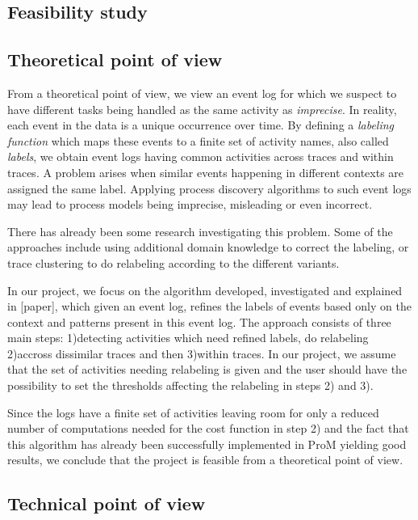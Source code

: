 \documentclass[notitlepage]{article}
\begin{document}
\begin{flushleft}
\section{Feasibility study}

\subsection{Theoretical point of view}

From a theoretical point of view, we view an event log for which we suspect to have different tasks being handled as the same activity as \textit{imprecise}.
In reality, each event in the data is a unique occurrence over time.
By defining a \textit{labeling  function} which maps these events to a finite set of activity names, also called \textit{labels}, we obtain event logs having common activities across traces and within traces.
A problem arises when similar events happening in different contexts are assigned the same label.
Applying process discovery algorithms to such event logs may lead to process models being imprecise, misleading or even incorrect.

There has already been some research investigating this problem. 
Some of the approaches include using additional domain knowledge to correct the labeling, or trace clustering to do relabeling according to the different variants.

In our project, we focus on the algorithm developed, investigated and explained in [paper], which given an event log, refines the labels of events based only on the context and patterns present in this event log.
The approach consists of three main steps: 1)detecting activities which need refined labels, do relabeling 2)accross dissimilar traces and then 3)within traces.
In our project, we assume that the set of activities needing relabeling is given and the user should have the possibility to set the thresholds affecting the relabeling in steps 2) and 3).

Since the logs have a finite set of activities leaving room for only a reduced number of computations needed for the cost function in step 2) and the fact that this algorithm has already been successfully implemented in ProM yielding good results, we conclude that the project is feasible from a theoretical point of view.\\

\subsection{Technical point of view}


\end{flushleft}
\end{document}
